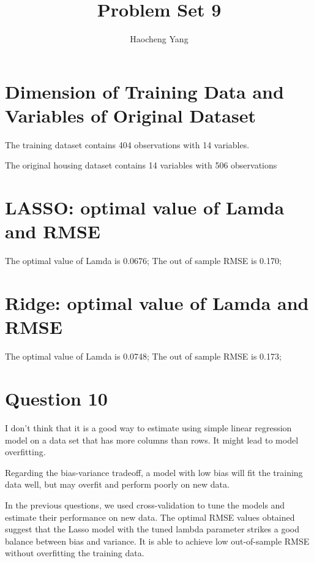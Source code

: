\documentclass{article}
\title{Problem Set 9}
\author{Haocheng Yang}
\begin{document}
\maketitle


\section{Dimension of Training Data and Variables of Original Dataset}

The training dataset contains 404 observations with 14 variables.

The original housing dataset contains 14 variables with 506 observations

\section{LASSO: optimal value of Lamda and RMSE }

The optimal value of Lamda is 0.0676;
The out of sample RMSE is 0.170;

\section{Ridge: optimal value of Lamda and RMSE}
The optimal value of Lamda is 0.0748;
The out of sample RMSE is 0.173;

\section{Question 10}

I don't think that it is a good way to estimate using simple linear regression model on a data set that has more columns than rows. It might lead to model overfitting.

Regarding the bias-variance tradeoff, a model with low bias will fit the training data well, but may overfit and perform poorly on new data.

In the previous questions, we used cross-validation to tune the models and estimate their performance on new data. The optimal RMSE values obtained suggest that the Lasso model with the tuned lambda parameter strikes a good balance between bias and variance. It is able to achieve low out-of-sample RMSE without overfitting the training data.
\end{document}
